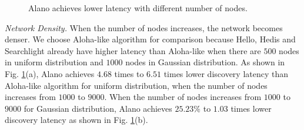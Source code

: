 \begin{figure}[!h]
\centering
{}
\hspace{0.01in}
\caption{Alano achieves lower latency with different number of nodes.}
\label{fig_node}
\end{figure}

\emph{Network Density.}
When the number of nodes increases, the network becomes denser. We choose Aloha-like algorithm for comparison because Hello, Hedis and Searchlight already have higher latency than Aloha-like when there are $500$ nodes in uniform distribution and $1000$ nodes in Gaussian distribution.
As shown in Fig. \ref{fig_node}(a), Alano achieves $4.68$ times to $6.51$ times lower discovery latency than Aloha-like algorithm for uniform distribution, when the number of nodes increases from $1000$ to $9000$.
When the number of nodes increases from $1000$ to $9000$ for Gaussian distribution, Alano achieves $25.23\%$ to $1.03$ times lower discovery latency as shown in Fig. \ref{fig_node}(b).  





